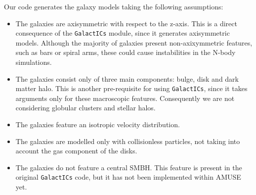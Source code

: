 \documentclass[a4paper,12pt, english]{article}
\begin{document}
\smallskip
Our code generates the galaxy models taking the following assumptions:
\begin{itemize}
    \item The galaxies are axisymmetric with respect to the z-axis. This is a direct consequence of the \texttt{GalactICs} module, since it generates axisymmetric models. Although the majority of galaxies present non-axixymmetric features, such as bars or spiral arms, these could cause instabilities in the N-body simulations.
    \item The galaxies consist only of three main components: bulge, disk and dark matter halo. This is another pre-requisite for using \texttt{GalactICs}, since it takes arguments only for these macroscopic features. Consequently we are not considering globular clusters and stellar halos.
    \item The galaxies feature an isotropic velocity distribution.
    \item The galaxies are modelled only with collisionless particles, not taking into account the gas component of the disks.
    \item The galaxies do not feature a central SMBH. This feature is present in the original \texttt{GalactICs} code, but it has not been implemented within AMUSE yet.
\end{itemize}\par
\smallskip
\end{document}
